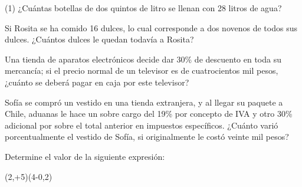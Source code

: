 \documentclass[]{srs}
\begin{document}
\begin{preguntas}(1)
  \pregunta ¿Cuántas botellas de dos quintos de litro se llenan con 28 litros de agua?
  \begin{malla}[height=7cm]
  \end{malla}
  \pregunta Si Rosita se ha comido 16 dulces, lo cual corresponde a dos novenos de todos sus dulces.
  ¿Cuántos dulces le quedan todavía a Rosita?
  \begin{malla}[height=7cm]
  \end{malla}
  \pregunta Una tienda de aparatos electrónicos decide dar 30\% de descuento en toda su mercancía;
  si el precio normal de un televisor es de cuatrocientos mil pesos,
  ¿cuánto se deberá pagar en caja por este televisor?
  \begin{malla}[height=7cm]
  \end{malla}

  \pregunta Sofía se compró un vestido en una tienda extranjera, y al llegar su paquete
  a Chile, aduanas le hace un sobre cargo del 19\% por concepto de IVA y otro 30\% adicional
  por sobre el total anterior en impuestos específicos.
  ¿Cuánto varió porcentualmente el vestido de Sofía,
  si originalmente le costó veinte mil pesos?
  \begin{malla}[height=7cm]
  \end{malla}

  \pregunta Determine el valor de la siguiente expresión:
  \begin{mcaja}
   \left(2,+5\right)\div\left(4-0,2\right)
  \end{mcaja}
  \begin{malla}[height=14cm]
  \end{malla}


\end{preguntas}
\end{document}
